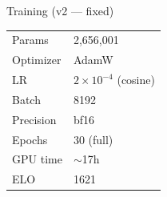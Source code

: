 \documentclass{beamer}
\begin{document}
\begin{frame}
\begin{columns}
\vspace{0.4em}
\begin{block}{Training (v2 --- fixed)}
\footnotesize
\begin{tabular}{ll}
Params & 2,656,001 \\
Optimizer & AdamW \\
LR & $2\times10^{-4}$ (cosine) \\
Batch & 8192 \\
Precision & bf16 \\
Epochs & 30 (full) \\
GPU time & $\sim$17h \\
\alert{ELO} & \alert{1621} \\
\end{tabular}
\end{block}

\end{columns}

\end{frame}
\end{document}
